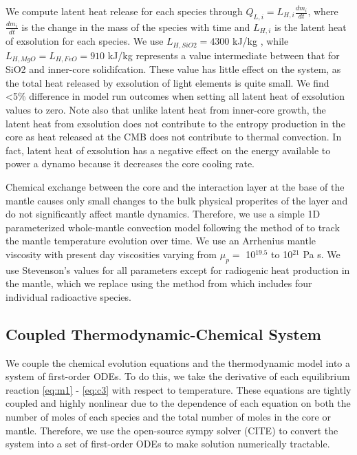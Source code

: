 \documentclass[]{article}
\begin{document}
	We compute latent heat release for each species through
	\(Q_{L,i} = L_{H,i}\frac{dm_i}{dt}\), where \(\frac{dm_i}{dt}\) is the
	change in the mass of the species with time and \(L_{H,i}\) is the
	latent heat of exsolution for each species. We use \(L_{H,SiO2} = 4300\)
	kJ/kg \citep{Hirose2017}, while \(L_{H,MgO} = L_{H,FeO}=910\) kJ/kg
	represents a value intermediate between that for SiO2 and inner-core
	solidifcation. These value has little effect on the system, as the total
	heat released by exsolution of light elements is quite small. We find \textless{}5\% difference in model run outcomes when setting all latent heat of exsolution values to zero. Note also that unlike latent heat from inner-core growth, the latent heat from exsolution does not contribute to the entropy production in the core as heat released at the CMB does not contribute to thermal convection. In fact, latent heat of exsolution has a negative effect on the energy available to power a dynamo because it decreases the core cooling rate.
	
	Chemical exchange between the core and the interaction layer at the base of the mantle causes only small changes to the bulk physical properites of the layer  and do not significantly affect mantle dynamics. Therefore, we use a simple 1D parameterized whole-mantle convection model following the method of \citep{Stevenson1983} to track the mantle temperature evolution over time. We use an Arrhenius mantle viscosity with present day viscosities varying from \(\mu_p=\) 10\(^{19.5}\) to 10\(^{21}\) Pa s. We use Stevenson's values for all parameters except for radiogenic heat production in the mantle, which we replace using the method from \citet{Korenaga2006} which includes four individual radioactive species.
	
	\subsection{Coupled Thermodynamic-Chemical System} \label{system-of-equations}
	
	We couple the chemical evolution equations and the thermodynamic model into a system of first-order ODEs. To do this, we take the derivative of each equilibrium reaction \eqref{eq:m1} - \eqref{eq:c3} with respect to temperature. These equations are tightly coupled and highly nonlinear due to the dependence of each equation on both the number of moles of each species and the total number of moles in the core or mantle. Therefore, we use the open-source sympy solver (CITE) to convert the system into a set of first-order ODEs to make solution numerically tractable. 
	
\end{document}
